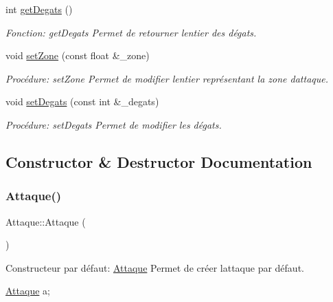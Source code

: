 \begin{DoxyCompactItemize}
int \hyperlink{classAttaque_a56856e2880988e4cf9b051d32ca427a3}{get\+Degats} ()
\begin{DoxyCompactList}\small\item\em Fonction\+: get\+Degats Permet de retourner l\textquotesingle{}entier des dégats. \end{DoxyCompactList}\item 
void \hyperlink{classAttaque_ae6dc5afd850f4518e937b8a2c08ac764}{set\+Zone} (const float \&\+\_\+zone)
\begin{DoxyCompactList}\small\item\em Procédure\+: set\+Zone Permet de modifier l\textquotesingle{}entier représentant la zone d\textquotesingle{}attaque. \end{DoxyCompactList}\item 
void \hyperlink{classAttaque_ad1af4e5ae848c40c7879fa4f9a56c674}{set\+Degats} (const int \&\+\_\+degats)
\begin{DoxyCompactList}\small\item\em Procédure\+: set\+Degats Permet de modifier les dégats. \end{DoxyCompactList}\end{DoxyCompactItemize}


\subsection{Constructor \& Destructor Documentation}
\mbox{\label{classAttaque_a1683db1342d1d26f9fc2162ef1975b23}} 
\subsubsection{\texorpdfstring{Attaque()}{Attaque()}\hspace{0.1cm}{\footnotesize\ttfamily [1/3]}}
{\footnotesize\ttfamily Attaque\+::\+Attaque (\begin{DoxyParamCaption}{ }\end{DoxyParamCaption})}



Constructeur par défaut\+: \hyperlink{classAttaque}{Attaque} Permet de créer l\textquotesingle{}attaque par défaut. 


\begin{DoxyCode}
\hyperlink{classAttaque}{Attaque} a;
\end{DoxyCode}
 \mbox{\label{classAttaque_a1a6b78c3649a5860530da68f9c6bbfbf}} 
